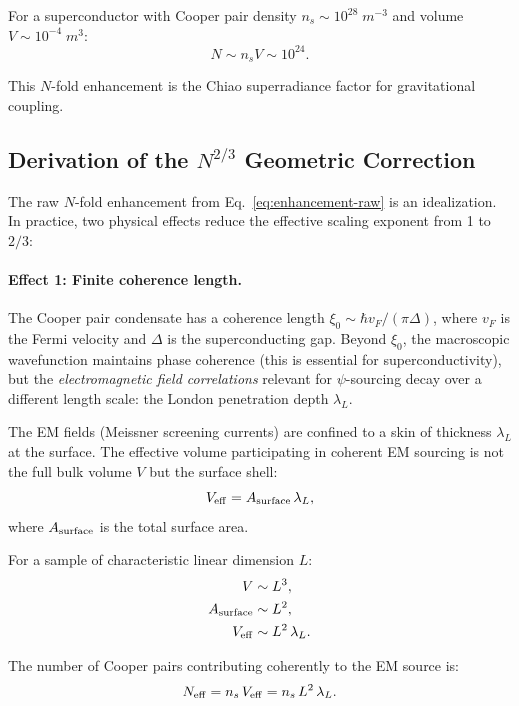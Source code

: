 \documentclass[aps,prd,twocolumn,superscriptaddress,floatfix,nofootinbib]{revtex4-2}
\begin{document}
For a superconductor with Cooper pair density
$n_s \sim 10^{28}\;\si{m^{-3}}$ and volume $V \sim 10^{-4}\;\si{m^3}$:
\begin{equation}
N \sim n_s V \sim 10^{24}.
\end{equation}

This $N$-fold enhancement is the Chiao superradiance factor for
gravitational coupling.

\subsection{Derivation of the $N^{2/3}$ Geometric Correction}
\label{sec:N23}

The raw $N$-fold enhancement from Eq.~\eqref{eq:enhancement-raw}
is an idealization. In practice, two physical effects reduce the
effective scaling exponent from 1 to $2/3$:

\paragraph{Effect 1: Finite coherence length.}
The Cooper pair condensate has a coherence length
$\xi_0 \sim \hbar v_F/(\pi\Delta)$, where $v_F$ is the Fermi velocity
and $\Delta$ is the superconducting gap. Beyond $\xi_0$, the
macroscopic wavefunction maintains phase coherence (this is
essential for superconductivity), but the \emph{electromagnetic field
correlations} relevant for $\psi$-sourcing decay over a different
length scale: the London penetration depth $\lambda_L$.

The EM fields (Meissner screening currents) are confined to a skin
of thickness $\lambda_L$ at the surface. The effective volume
participating in coherent EM sourcing is not the full bulk volume
$V$ but the surface shell:
\begin{equation}
V_{\rm eff} = A_{\rm surface}\,\lambda_L,
\end{equation}
where $A_{\rm surface}$ is the total surface area.

For a sample of characteristic linear dimension $L$:
\begin{align}
V &\sim L^3, \\
A_{\rm surface} &\sim L^2, \\
V_{\rm eff} &\sim L^2\,\lambda_L.
\end{align}

The number of Cooper pairs contributing coherently to the EM source is:
\begin{equation}
N_{\rm eff} = n_s\,V_{\rm eff} = n_s\,L^2\,\lambda_L.
\end{equation}
\end{document}
